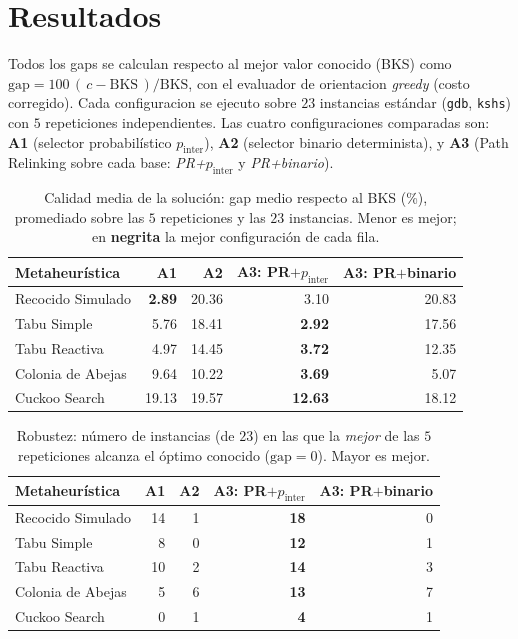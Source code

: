 \section{Resultados}
\label{sec:resultados}
Todos los gaps se calculan respecto al mejor valor conocido (BKS) como $\mathrm{gap}=100\,(\,c-\mathrm{BKS}\,)/\mathrm{BKS}$, con el evaluador de orientacion \emph{greedy} (costo corregido). Cada configuracion se ejecuto sobre $23$ instancias est\'andar (\texttt{gdb}, \texttt{kshs}) con $5$ repeticiones independientes. Las cuatro configuraciones comparadas son: \textbf{A1} (selector probabil\'istico $p_{\text{inter}}$), \textbf{A2} (selector binario determinista), y \textbf{A3} (Path Relinking sobre cada base: \emph{PR+$p_{\text{inter}}$} y \emph{PR+binario}).

\begin{table}[htbp]\centering
\caption{Calidad media de la soluci\'on: gap medio respecto al BKS (\%), promediado sobre las $5$ repeticiones y las $23$ instancias. Menor es mejor; en \textbf{negrita} la mejor configuraci\'on de cada fila.}
\label{tab:gap-medio}
\begin{tabular}{l rrrr}
\toprule
Metaheur\'istica & A1 & A2 & A3: PR$+p_{\text{inter}}$ & A3: PR$+$binario \\
\midrule
Recocido Simulado & \textbf{2.89} & 20.36 & 3.10 & 20.83 \\
Tabu Simple & 5.76 & 18.41 & \textbf{2.92} & 17.56 \\
Tabu Reactiva & 4.97 & 14.45 & \textbf{3.72} & 12.35 \\
Colonia de Abejas & 9.64 & 10.22 & \textbf{3.69} & 5.07 \\
Cuckoo Search & 19.13 & 19.57 & \textbf{12.63} & 18.12 \\
\bottomrule
\end{tabular}
\end{table}

\begin{table}[htbp]\centering
\caption{Robustez: n\'umero de instancias (de $23$) en las que la \emph{mejor} de las $5$ repeticiones alcanza el \'optimo conocido ($\mathrm{gap}=0$). Mayor es mejor.}
\label{tab:optimos}
\begin{tabular}{l rrrr}
\toprule
Metaheur\'istica & A1 & A2 & A3: PR$+p_{\text{inter}}$ & A3: PR$+$binario \\
\midrule
Recocido Simulado & 14 & 1 & \textbf{18} & 0 \\
Tabu Simple & 8 & 0 & \textbf{12} & 1 \\
Tabu Reactiva & 10 & 2 & \textbf{14} & 3 \\
Colonia de Abejas & 5 & 6 & \textbf{13} & 7 \\
Cuckoo Search & 0 & 1 & \textbf{4} & 1 \\
\bottomrule
\end{tabular}
\end{table}

